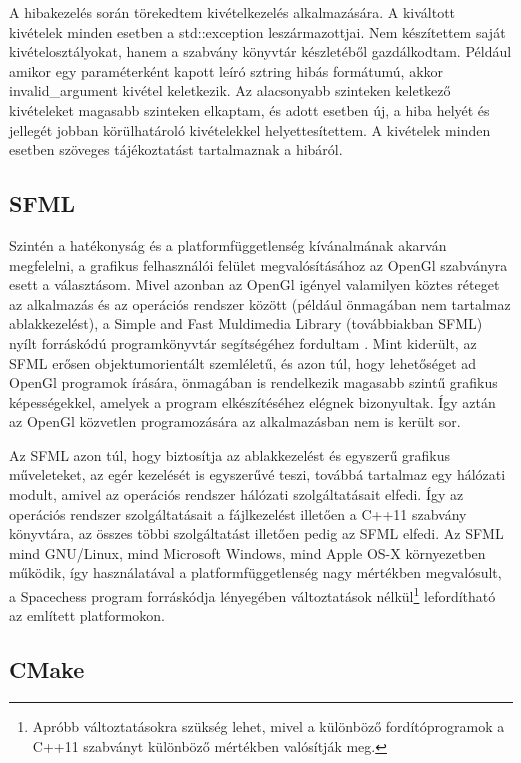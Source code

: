 \documentclass[12pt, twoside]{report}
\begin{document}
A hibakezelés során törekedtem kivételkezelés alkalmazására. A kiváltott kivételek minden esetben a std::exception leszármazottjai. Nem készítettem saját kivételosztályokat, hanem a szabvány könyvtár készletéből gazdálkodtam. Például amikor egy paraméterként kapott leíró sztring hibás formátumú, akkor invalid\_argument kivétel keletkezik. Az alacsonyabb szinteken keletkező kivételeket magasabb szinteken elkaptam, és adott esetben új, a hiba helyét és jellegét jobban körülhatároló kivételekkel helyettesítettem. A kivételek minden esetben szöveges tájékoztatást tartalmaznak a hibáról.

\subsection{SFML}

Szintén a hatékonyság és a platformfüggetlenség kívánalmának akarván megfelelni, a grafikus felhasználói felület megvalósításához az OpenGl szabványra esett a választásom. Mivel azonban az OpenGl igényel valamilyen köztes réteget az alkalmazás és az operációs rendszer között (például önmagában nem tartalmaz ablakkezelést), a Simple and Fast Muldimedia Library (továbbiakban SFML) nyílt forráskódú programkönyvtár se\-gít\-sé\-gé\-hez fordultam \cite{sfml}. Mint kiderült, az SFML erősen objektumorientált szemléletű, és azon túl, hogy lehetőséget ad OpenGl programok írására, önmagában is rendelkezik magasabb szintű grafikus képességekkel, amelyek a program elkészítéséhez elégnek bizonyultak. Így aztán az OpenGl közvetlen programozására az alkalmazásban nem is került sor. 

Az SFML azon túl, hogy biztosítja az ablakkezelést és egyszerű grafikus műveleteket, az egér kezelését is egyszerűvé teszi, továbbá tartalmaz egy hálózati modult, amivel az operációs rendszer hálózati szolgáltatásait elfedi. Így az operációs rendszer szolgáltatásait a fájlkezelést illetően a C++11 szabvány könyvtára, az összes többi szolgáltatást illetően pedig az SFML elfedi. Az SFML mind GNU/Linux, mind Microsoft Windows, mind Apple OS-X környezetben működik, így használatával a platformfüggetlenség nagy mértékben megvalósult, a Spacechess program forráskódja lé\-nye\-gé\-ben változtatások nélkül\footnote{Apróbb változtatásokra szükség lehet, mivel a különböző fordítóprogramok a C++11 szabványt különböző mértékben valósítják meg.} lefordítható az említett platformokon. 

\subsection{CMake}
\end{document}
